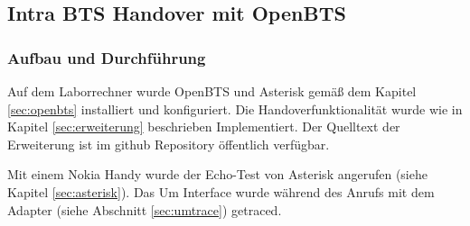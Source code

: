 \subsection{Intra BTS Handover mit OpenBTS}
\subsubsection{Aufbau und Durchführung}
Auf dem Laborrechner wurde OpenBTS und Asterisk gemäß dem Kapitel \ref{sec:openbts} installiert und konfiguriert. Die Handoverfunktionalität wurde wie in Kapitel \ref{sec:erweiterung} beschrieben Implementiert. Der Quelltext der Erweiterung ist im github Repository \cite{bib:openbtshandover} öffentlich verfügbar. 

Mit einem Nokia Handy wurde der Echo-Test von Asterisk angerufen (siehe Kapitel \ref{sec:asterisk}). Das Um Interface wurde während des Anrufs mit dem Adapter (siehe Abschnitt \ref{sec:umtrace}) getraced. 










































